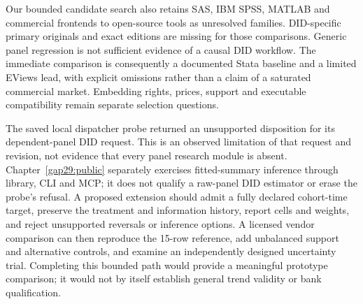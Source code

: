 Our bounded candidate search also retains SAS, IBM SPSS, MATLAB and
commercial frontends to open-source tools as unresolved families.
DID-specific primary originals and exact editions are missing for those
comparisons. Generic panel regression is not sufficient evidence of a
causal DID workflow. The immediate comparison is consequently a documented
Stata baseline and a limited EViews lead, with explicit omissions rather
than a claim of a saturated commercial market. Embedding rights, prices,
support and executable compatibility remain separate selection questions.

The saved local dispatcher probe returned an unsupported disposition for
its dependent-panel DID request. This is an observed limitation of that
request and revision, not evidence that every panel research module is absent.
Chapter~\ref{gap29:public} separately exercises fitted-summary inference through
library, CLI and MCP; it does not qualify a raw-panel DID estimator or erase
the probe's refusal. A proposed extension should admit a
fully declared cohort-time target, preserve the treatment and information
history, report cells and weights, and reject unsupported reversals or
inference options. A licensed vendor comparison can then reproduce the
15-row reference, add unbalanced support and alternative controls, and
examine an independently designed uncertainty trial. Completing this
bounded path would provide a meaningful prototype comparison; it would
not by itself establish general trend validity or bank qualification.
\citep{exec18_gp_dispatch,exec18_gp_panel_reference}
